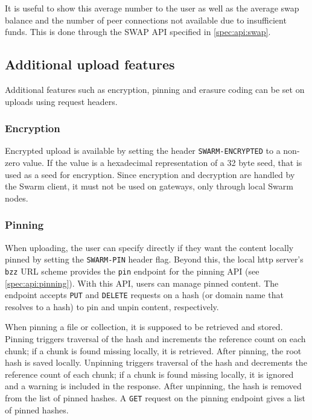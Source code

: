 It is useful to show this average number to the user as well as the average swap balance and the number of peer connections not available due to insufficient funds. This is done through the SWAP API specified in \ref{spec:api:swap}.

\subsection{Additional upload features \statusgreen}\label{sec:features}

Additional features such as encryption, pinning and erasure coding can be set on uploads using request headers. 


\subsubsection{Encryption}

Encrypted upload is available by setting the header \lstinline{SWARM-ENCRYPTED} to a non-zero value. If the value is a hexadecimal representation of a 32 byte seed, that is used as a seed for encryption. Since encryption and decryption are handled by the Swarm client, it must not be used on gateways, only through local Swarm nodes.

\subsubsection{Pinning}

When uploading, the user can specify directly if they want the content locally pinned by setting the \lstinline{SWARM-PIN} header flag. Beyond this, the local http server's \lstinline{bzz} URL scheme provides the \lstinline{pin} endpoint for the pinning API (see \ref{spec:api:pinning}). With this API, users can manage pinned content. The endpoint accepts \lstinline{PUT} and \lstinline{DELETE} requests on a hash (or domain name that resolves to a hash) to pin and unpin content, respectively.

When pinning a file or collection, it is supposed to be retrieved and stored. Pinning triggers traversal of the hash and increments the reference count on each chunk; if a chunk is found missing locally, it is retrieved. After pinning,  the root hash is saved locally. Unpinning triggers traversal of the hash and decrements the reference count of each chunk; if a chunk is found missing locally, it is ignored and a warning is included in the response. After unpinning, the hash is removed from the list of pinned hashes. A \lstinline{GET} request on the pinning endpoint gives a list of pinned hashes.  



